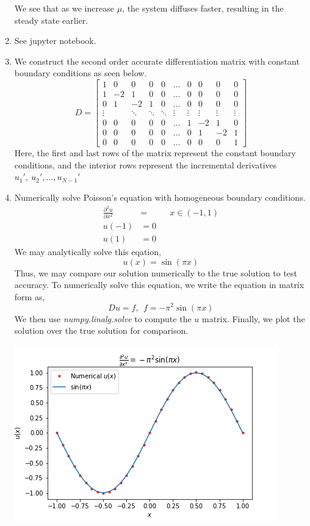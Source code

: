 \documentclass[letterpaper,10pt]{article}
\begin{document}
\begin{enumerate}
\begin{center}
\end{center}
We see that as we increase $\mu$, the system diffuses faster, resulting in the steady state earlier.
\item See jupyter notebook.
\item We construct the second order accurate differentiation matrix with constant boundary conditions as seen below.
\[D=\begin{bmatrix}
1 & 0 & 0 & 0 & 0 & \ldots & 0 & 0 & 0 & 0\\
1 & -2 & 1 & 0 & 0 & \ldots & 0 & 0 & 0 & 0\\
0 & 1 & -2 & 1 & 0 & \ldots & 0 & 0 & 0 & 0\\
\vdots & & \ddots & \ddots & \ddots & \vdots & \vdots & \vdots & \vdots & \vdots\\
0 & 0 & 0 & 0 & 0 & \ldots & 1 & -2 & 1 & 0 \\
0 & 0 & 0 & 0 & 0 & \ldots & 0 & 1 & -2 & 1 \\
0 & 0 & 0 & 0 & 0 & \ldots & 0 & 0 & 0 & 1
\end{bmatrix}\]
Here, the first and last rows of the matrix represent the constant boundary conditions, and the interior rows represent the incremental derivatives $u_1',\ u_2',\ldots, u_{N-1}'$
\item Numerically solve Poisson's equation with homogeneous boundary conditions.
\begin{align*}
\frac{\partial ^2 u}{\partial x^2}&= && x\in (-1,1)\\
u(-1) &= 0\\
u(1) &= 0
\end{align*}
We may analytically solve this eqation,
\[u(x) = \sin(\pi x)\]
Thus, we may compare our solution numerically to the true solution to test accuracy. To numerically solve this equation, we write the equation in matrix form as,
\[Du=f,\ \ f=-\pi^2\sin(\pi x)\]
We then use \textit{numpy.linalg.solve} to compute the $u$ matrix. Finally, we plot the solution over the true solution for comparison.
\begin{center}
\includegraphics[scale=1]{4.png}

\end{center}
\end{enumerate}
\end{document}
